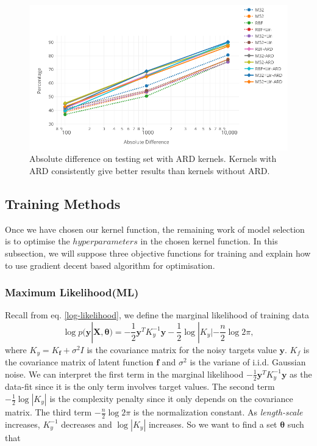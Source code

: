 \documentclass[11pt,a4paper]{article}
\theoremstyle{definition}
\numberwithin{equation}{section}
\let\vec\mathbf
\begin{document}
	\begin{figure}[h!]
		\centering
		\includegraphics[width=1.0\textwidth]{ARD_diff.png}
		\caption{Absolute difference on testing set with ARD kernels. Kernels with ARD consistently give better results than kernels without ARD.}
		\label{ARD_diff}
	\end{figure}
	
	
	\subsection{Training Methods}
	Once we have chosen our kernel function, the remaining work of model selection is to optimise the $hyperparameters$ in the chosen kernel function. In this subsection, we will suppose three objective functions for training and explain how to use gradient decent based algorithm for optimisation.
	
	\subsubsection{Maximum Likelihood(ML)}
	Recall from eq. \ref{log-likelihood}, we define the marginal likelihood of training data
	\begin{equation}
	\log p(\vec y|\vec X, \vec \theta)=-\frac{1}{2}\vec y^T K_y^{-1}\vec y-\frac{1}{2}\log|K_y| - \frac{n}{2}\log 2\pi,
	\end{equation}
	where $K_y = K_{\vec f}+\sigma^2 I$ is the covariance matrix for the noisy targets value $\vec y$. $K_f$ is the covariance matrix of latent function $\vec f$ and $\sigma^2$ is the variane of i.i.d. Gaussian noise. We can interpret the first term in the marginal likelihood $-\frac{1}{2}\vec y^T K_y^{-1}\vec y$ as the data-fit since it is the only term involves target values. The second term $-\frac{1}{2}\log|K_y|$ is the complexity penalty since it only depends on the covariance matrix. The third term $- \frac{n}{2}\log 2\pi$ is the normalization constant\cite[Rasmussen and Williams, sec 5.4]{RandW}. As \textit{length-scale} increases, $K_y^{-1}$ decreases and $\log|K_y|$ increases. So we want to find a set $\vec \theta$ such that
	
\end{document}
